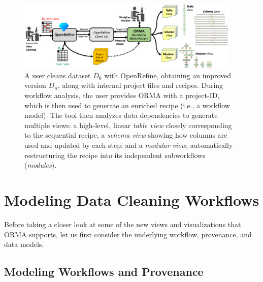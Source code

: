 \documentclass[conference]{ijdc-v14}
\newcommand{\ortoyw}{\textsf{or2yw}\xspace}
\newcommand{\orma}{\textsf{ORMA}\xspace}  %
\newcommand{\openrefine}{\textrm{OpenRefine}\xspace}
\begin{document}

\begin{figure}[t]
\centering
\includegraphics[width=0.95\textwidth]{figures/architecture-overview-crop.pdf}
\caption{A user cleans dataset $D_0$ with \openrefine, obtaining an
  improved version $D_n$, along with internal project files and recipes. During workflow analysis, the user
  provides \orma with a project-ID, which is then used to generate an enriched recipe (i.e., a workflow
  model). The tool then analyzes data dependencies to generate multiple views: a high-level, linear
  \emph{table view} closely corresponding to the sequential recipe, a \emph{schema view} showing
  how columns are used and updated by each step; and a \emph{modular view}, automatically
  restructuring the recipe into its independent subworkflows (\emph{modules}).}
\label{fig:architecture-overview}
\end{figure}


\section{Modeling Data Cleaning Workflows}

Before taking a closer look at some of the new views and visualizations that \orma supports,
let us first consider the underlying workflow, provenance, and data models.

\subsection{Modeling Workflows and Provenance}
\label{sec:workflows-provenance}
\end{document}
